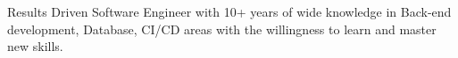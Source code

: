 
\begin{cvparagraph}

Results Driven Software Engineer with 10+ years of wide knowledge in Back-end development, Database, CI/CD areas with the willingness to learn and master new skills.
\end{cvparagraph}
